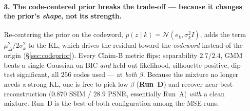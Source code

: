 \documentclass[11pt]{article}
\begin{document}
\paragraph{3. The code-centered prior breaks the trade-off --- because it changes the prior's
\emph{shape}, not its strength.}
Re-centering the prior on the codeword, $p(z\mid k)=\mathcal{N}(e_k,\sigma_k^2 I)$, adds the term
$\mu_\Delta^2/2\sigma_k^2$ to the KL, which drives the residual toward the \emph{codeword} instead
of the origin (\S\ref{sec:codeprior}). Every Claim-B metric flips: separability $2.7$/$2.4$, GMM
beats a single Gaussian on BIC \emph{and} held-out likelihood, silhouette positive, dip test
significant, all $256$ codes used --- at \emph{both} $\beta$. Because the mixture no longer needs a
strong KL, one is free to pick low $\beta$ (\textbf{Run~D}) and recover near-best reconstruction
($0.870$ SSIM / $28.9$ PSNR, essentially Run~A) \emph{with} a clean mixture. Run~D is the
best-of-both configuration among the MSE runs.
\end{document}
